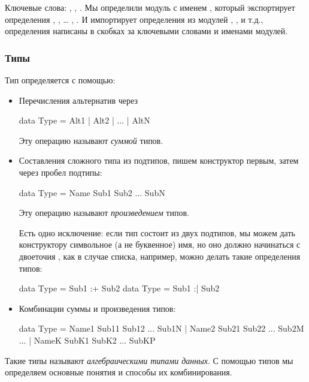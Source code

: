 Ключевые слова: , , . Мы определили
модуль с именем , который экспортирует определения ,
, \ldots{} , . И импортирует определения из модулей
, , и т.д., определения написаны в скобках за
ключевыми словами  и именами модулей.

\subsubsection{Типы}

Тип определяется с помощью:

\begin{itemize}
\item
  Перечисления альтернатив через \In{|}


  \begin{code}
  data Type = Alt1 | Alt2 | ... | AltN
  \end{code}

  Эту операцию называют \emph{суммой} типов.
\item
  Составления сложного типа из подтипов, пишем конструктор первым, затем
  через пробел подтипы:


  \begin{code}
  data Type = Name  Sub1  Sub2  ...  SubN
  \end{code}

  Эту операцию называют \emph{произведением} типов.

  Есть одно исключение: если тип состоит из двух подтипов, мы можем дать
  конструктору символьное (а не буквенное) имя, но оно должно начинаться
  с двоеточия \In{:}, как в случае списка, например, можно делать такие
  определения типов:


  \begin{code}
  data Type = Sub1 :+ Sub2 
  data Type = Sub1 :| Sub2 
  \end{code}
\item
  Комбинации суммы и произведения типов:


  \begin{code}
  data Type = Name1  Sub11  Sub12  ...  Sub1N
            | Name2  Sub21  Sub22  ...  Sub2M
            ...
            | NameK  SubK1  SubK2  ...  SubKP
  \end{code}
\end{itemize}

Такие типы называют \emph{алгебраическими типами данных}. С помощью
типов мы определяем основные понятия и способы их комбинирования.

